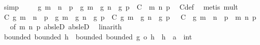 \begin{isabellebody}
\ simp\isanewline
\ \ \isamarkupfalse%
\ {\isacharasterisk}{\kern0pt}{\isacharcolon}{\kern0pt}\ {\isachardoublequoteopen}{\isasymbar}g\ {\isacharparenleft}{\kern0pt}m\ {\isacharminus}{\kern0pt}\ {\isacharparenleft}{\kern0pt}n\ {\isacharplus}{\kern0pt}\ p{\isacharparenright}{\kern0pt}{\isacharparenright}{\kern0pt}\ {\isacharminus}{\kern0pt}\ {\isacharparenleft}{\kern0pt}g\ m\ {\isacharminus}{\kern0pt}\ {\isacharparenleft}{\kern0pt}g\ n\ {\isacharplus}{\kern0pt}\ g\ p{\isacharparenright}{\kern0pt}{\isacharparenright}{\kern0pt}{\isasymbar}\ {\isasymle}\ C{\isachardoublequoteclose}\ \ m\ n\ p\ \isamarkupfalse%
\ C{\isacharunderscore}{\kern0pt}def\ \isamarkupfalse%
\ {\isacharparenleft}{\kern0pt}metis\ mult{\isacharunderscore}{\kern0pt}{}{\isacharparenright}{\kern0pt}\isanewline
\ \ \isamarkupfalse%
\ C{\isacharcolon}{\kern0pt}\ {\isachardoublequoteopen}g\ {\isacharparenleft}{\kern0pt}m\ {\isacharminus}{\kern0pt}\ {\isacharparenleft}{\kern0pt}n\ {\isacharplus}{\kern0pt}\ p{\isacharparenright}{\kern0pt}{\isacharparenright}{\kern0pt}\ {\isasymle}\ g\ m\ {\isacharminus}{\kern0pt}\ {\isacharparenleft}{\kern0pt}g\ n\ {\isacharplus}{\kern0pt}\ g\ p{\isacharparenright}{\kern0pt}\ {\isacharplus}{\kern0pt}\ C{\isachardoublequoteclose}\ {\isachardoublequoteopen}g\ m\ {\isacharminus}{\kern0pt}\ {\isacharparenleft}{\kern0pt}g\ n\ {\isacharplus}{\kern0pt}\ g\ p{\isacharparenright}{\kern0pt}\ {\isacharplus}{\kern0pt}\ {\isacharparenleft}{\kern0pt}{\isacharminus}{\kern0pt}\ C{\isacharparenright}{\kern0pt}\ {\isasymle}\ g\ {\isacharparenleft}{\kern0pt}m\ {\isacharminus}{\kern0pt}\ {\isacharparenleft}{\kern0pt}n\ {\isacharplus}{\kern0pt}\ p{\isacharparenright}{\kern0pt}{\isacharparenright}{\kern0pt}{\isachardoublequoteclose}\ \ m\ n\ p\ \isamarkupfalse%
\ {\isacharasterisk}{\kern0pt}{\isacharbrackleft}{\kern0pt}of\ m\ n\ p{\isacharbrackright}{\kern0pt}\ abs{\isacharunderscore}{\kern0pt}le{\isacharunderscore}{\kern0pt}D{}\ abs{\isacharunderscore}{\kern0pt}le{\isacharunderscore}{\kern0pt}D{}\ \isamarkupfalse%
\ linarith{\isacharplus}{\kern0pt}\isanewline
\isanewline
\ \ \isamarkupfalse%
\ bounded{\isacharcolon}{\kern0pt}\ {\isachardoublequoteopen}bounded\ h{\isachardoublequoteclose}\ \ bounded{\isacharcolon}{\kern0pt}\ {\isachardoublequoteopen}bounded\ {\isacharparenleft}{\kern0pt}g\ o\ h{\isacharparenright}{\kern0pt}{\isachardoublequoteclose}\ \ h\ {\isacharcolon}{\kern0pt}{\isacharcolon}{\kern0pt}\ {\isachardoublequoteopen}{\isacharprime}{\kern0pt}a\ {\isasymRightarrow}\ int{\isachardoublequoteclose}\isanewline

\end{isabellebody}
